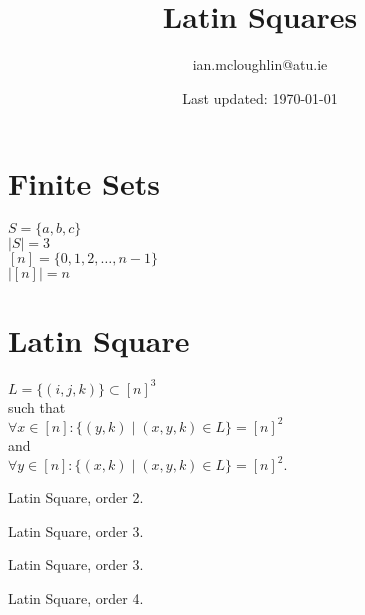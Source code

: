 \documentclass{iansnotes}
\title{Latin Squares}
\author{ian.mcloughlin@atu.ie}
\date{Last updated: \today}
\begin{document}
 
\maketitle

\section{Finite Sets}
$S = \{a,b,c\}$ \\[3mm]
$|S| = 3$ \\[3mm]
$[n] = \{0, 1, 2, \ldots, n-1\}$ \\[3mm]
$|[n]| = n$ \\[3mm]


\section{Latin Square}

$L = \{ (i,j,k) \} \subset [n]^3$ \\
such that \\
$\forall x \in [n]: \{(y,k) \; \vert \; (x,y,k) \in L\} = [n]^2$\\
and\\
$\forall y \in [n]: \{(x,k) \; \vert \; (x,y,k) \in L\} = [n]^2.$


\begin{marginfigure}[-30mm]
  \centering 
{}
\caption{Latin Square, order 2.}
\end{marginfigure}

\begin{marginfigure}
\centering
{}
\caption{Latin Square, order 3.}
\end{marginfigure}

\begin{marginfigure}[10mm]
  \centering
  \caption{Latin Square, order 3.}
  \end{marginfigure}

\begin{marginfigure}[10mm]
  \centering
  \caption{Latin Square, order 4.}
  \end{marginfigure}
\end{document}
